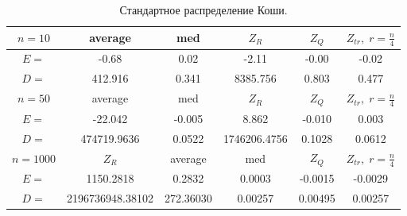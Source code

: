 \documentclass[a4]{article}
\begin{document}
			\begin{table}[h]
				\caption{ Стандартное распределение Коши.}
				\begin{center}
					\begin{tabular}{|c|c|c|c|c|c|}
						\hline
						$n = 10$   & average & med & $Z_R$ & $Z_Q$ & $Z_{tr},\;r=\frac{n}{4}$\\ \hline
						$E =$      & -0.68 &       0.02    &     -2.11  &      -0.00        &-0.02\\ \hline
						$D =$       &	412.916  &     0.341 &        8385.756    &  0.803       &  0.477\\    \hline
						
						$n = 50$   & average & med & $Z_R$ & $Z_Q$ & $Z_{tr},\;r=\frac{n}{4}$\\ \hline
						$E =$   &-22.042      & -0.005       & 8.862       &  -0.010      &  0.003\\   \hline
						$D =$      & 474719.9636   & 0.0522        & 1746206.4756  & 0.1028        & 0.0612  \\   \hline 
						
						$n = 1000$ & $Z_R$ & average & med  & $Z_Q$ & $Z_{tr},\;r=\frac{n}{4}$\\ \hline
						$E =$   &    1150.2818   & 0.2832 &        0.0003      &     -0.0015    &    -0.0029\\  \hline
						$D =$   & 2196736948.38102 &  272.36030      & 0.00257         & 0.00495 &        0.00257\\    
						\hline
					\end{tabular}
				\end{center}
			\end{table}
			\newpage
\end{document}
